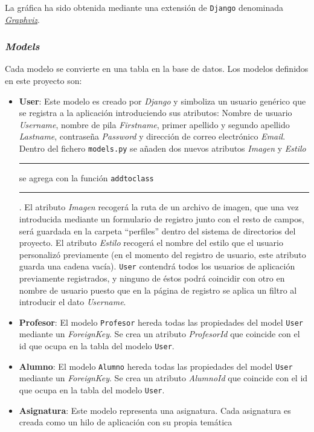 \documentclass[a4paper, 12pt]{book}
\begin{document}
La gr\'afica ha sido obtenida mediante una extensi\'on de \texttt{Django} denominada 
\href{https://code.djangoproject.com/wiki/DjangoGraphviz}{\textit{Graphviz}}.

\subsubsection{\textit{Models}} 
\label{sec:models}
Cada modelo se convierte en una tabla en la base de datos. Los modelos definidos en este proyecto son:

\begin{itemize}
  \item {\bfseries User}: Este modelo es creado por \textit{Django} y simboliza un usuario gen\'erico que se registra a la aplicaci\'on introduciendo sus 
  atributos: Nombre de usuario \textit{Username}, nombre de pila \textit{Firstname}, primer apellido y segundo apellido \textit{Lastname}, contrase\~na 
  \textit{Password} 
  y direcci\'on de correo electr\'onico \textit{Email}. Dentro del fichero \texttt{models.py} se a\~naden dos nuevos atributos \textit{Imagen} y \textit{Estilo}
  \rule[1mm]{4mm}{0.1mm}se agrega con la funci\'on \texttt{addtoclass}\rule[1mm]{4mm}{0.1mm}. El atributo \textit{Imagen} recoger\'a la ruta de un archivo de imagen,
  que una vez introducida mediante un formulario de registro junto con el resto de campos, ser\'a guardada en la carpeta ``perfiles'' dentro del sistema de directorios 
  del proyecto. El atributo \textit{Estilo} recoger\'a el nombre del estilo que el usuario personaliz\'o previamente (en el momento del registro de usuario, este 
  atributo guarda una cadena vac\'ia).
  \texttt{User} contendr\'a todos los usuarios de aplicaci\'on previamente registrados, y ninguno de \'estos podr\'a coincidir con otro en nombre de usuario
  puesto que en la p\'agina de registro se aplica un filtro al introducir el dato \textit{Username}.
  \item {\bfseries Profesor}: El modelo \texttt{Profesor} hereda todas las propiedades del model \texttt{User} mediante un \textit{ForeignKey}. Se crea un
  atributo \textit{ProfesorId} que coincide con el id que ocupa en la tabla del modelo \texttt{User}.
  \item {\bfseries Alumno}: El modelo \texttt{Alumno} hereda todas las propiedades del model \texttt{User} mediante un \textit{ForeignKey}. Se crea un
  atributo \textit{AlumnoId} que coincide con el id que ocupa en la tabla del modelo \texttt{User}.
  \item {\bfseries Asignatura}: Este modelo representa una asignatura. Cada asignatura es creada como un hilo de aplicaci\'on con su propia tem\'atica

\end{itemize}
\end{document}
